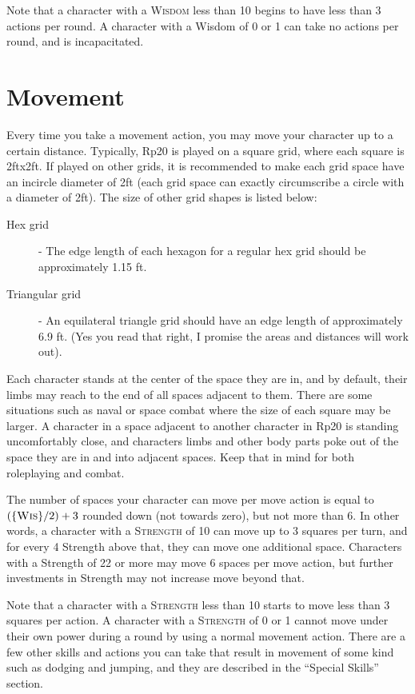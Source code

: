 Note that a character with a \textsc{Wisdom} less than 10 begins to have less than 3 actions per round. A character with a Wisdom of 0 or 1 can take no actions per round, and is incapacitated.

\section{Movement}
Every time you take a movement action, you may move your character up to a certain distance. Typically, Rp20 is played on a square grid, where each square is 2ftx2ft. If played on other grids, it is recommended to make each grid space have an incircle diameter of 2ft (each grid space can exactly circumscribe a circle with a diameter of 2ft). The size of other grid shapes is listed below:
\begin{description}
\item[Hex grid] - The edge length of each hexagon for a regular hex grid should be approximately 1.15 ft.
\item[Triangular grid] - An equilateral triangle grid should have an edge length of approximately 6.9 ft. (Yes you read that right, I promise the areas and distances will work out).
\end{description}
Each character stands at the center of the space they are in, and by default, their limbs may reach to the end of all spaces adjacent to them. There are some situations such as naval or space combat where the size of each square may be larger. A character in a space adjacent to another character in Rp20 is standing uncomfortably close, and characters limbs and other body parts poke out of the space they are in and into adjacent spaces. Keep that in mind for both roleplaying and combat.

The number of spaces your character can move per move action is equal to $(\{ \textsc{Wis} \}/2) + 3$ rounded down (not towards zero), but not more than 6. In other words, a character with a \textsc{Strength} of 10 can move up to 3 squares per turn, and for every 4 Strength above that, they can move one additional space. Characters with a Strength of 22 or more may move 6 spaces per move action, but further investments in Strength may not increase move beyond that.

Note that a character with a \textsc{Strength} less than 10 starts to move less than 3 squares per action. A character with a \textsc{Strength} of 0 or 1 cannot move under their own power during a round by using a normal movement action.
There are a few other skills and actions you can take that result in movement of some kind such as dodging and jumping, and they are described in the ``Special Skills'' section.

